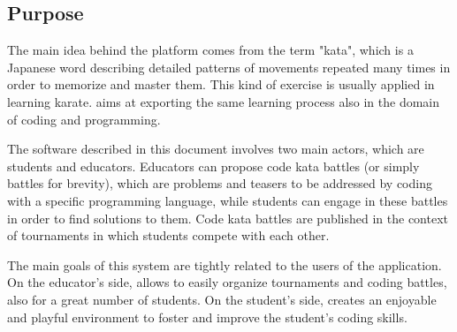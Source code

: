\subsection{Purpose}
The main idea behind the \app platform comes from the term "kata", which is a Japanese word describing detailed patterns of movements repeated many times in order to memorize and master them. This kind of exercise is usually applied in learning karate. \app aims at exporting the same learning process also in the domain of coding and programming. 

The software described in this document involves two main actors, which are students and educators.  Educators can propose code kata battles (or simply battles for brevity), which are problems and teasers to be addressed by coding with a specific programming language,  while students can engage in these battles in order to find solutions to them. Code kata battles are published in the context of tournaments in which students compete with each other.

The main goals of this system are tightly related to the users of the application. On the educator's side, \app allows to easily organize tournaments and coding battles, also for a great number of students. On the student's side, \app creates an enjoyable and playful environment to foster and improve the student's coding skills.